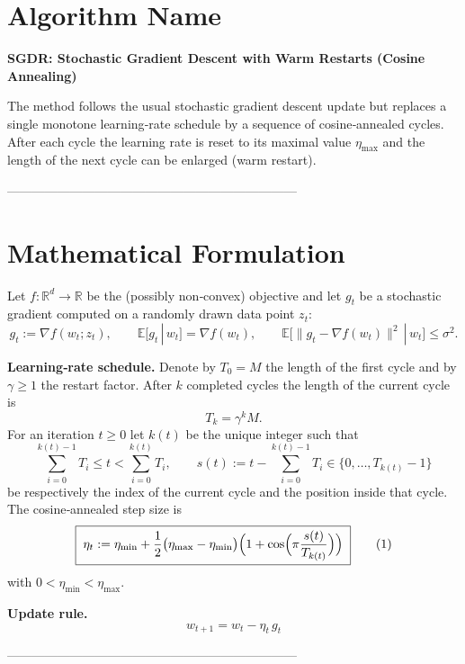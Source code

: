\documentclass{article}
\newcommand{\EE}{\mathbb{E}}
\newcommand{\RR}{\mathbb{R}}
\begin{document}
\section*{Algorithm Name}
\textbf{SGDR: Stochastic Gradient Descent with Warm Restarts (Cosine Annealing)}  

The method follows the usual stochastic gradient descent update but replaces a
single monotone learning‑rate schedule by a sequence of cosine‑annealed cycles.
After each cycle the learning rate is reset to its maximal value $\eta_{\max }$
and the length of the next cycle can be enlarged (warm restart).

---------------------------------------------------------------------

\section*{Mathematical Formulation}
Let $f:\RR^{d}\rightarrow\RR$ be the (possibly non‑convex) objective and let
$g_t$ be a stochastic gradient computed on a randomly drawn data point
$z_t$:
\[
g_t:=\nabla f(w_t;z_t),\qquad 
\EE[g_t\,|\,w_t]=\nabla f(w_t),\qquad 
\EE\big[\|g_t-\nabla f(w_t)\|^{2}\,|\,w_t\big]\le\sigma^{2}.
\]

\medskip
\noindent\textbf{Learning‑rate schedule.}
Denote by $T_{0}=M$ the length of the first cycle and by $\gamma\ge 1$ the
restart factor. After $k$ completed cycles the length of the current cycle is
\[
T_{k}= \gamma^{k}M .
\]
For an iteration $t\ge0$ let $k(t)$ be the unique integer such that
\[
\sum_{i=0}^{k(t)-1}T_{i}\le t < \sum_{i=0}^{k(t)}T_{i},
\qquad
s(t):=t-\sum_{i=0}^{k(t)-1}T_{i}\in\{0,\dots ,T_{k(t)}-1\}
\]
be respectively the index of the current cycle and the position inside that
cycle. The cosine‑annealed step size is
\[
\boxed{\;
\eta_t
:=\eta_{\min}
+\frac{1}{2}\bigl(\eta_{\max}-\eta_{\min}\bigr)
\Bigl(1+\cos\Bigl(\pi\frac{s(t)}{T_{k(t)}}\Bigr)\Bigr)
\; }                                             \tag{1}
\]
with $0<\eta_{\min}<\eta_{\max}$.

\medskip
\noindent\textbf{Update rule.}
\[
\boxed{\; w_{t+1}=w_{t}-\eta_{t}\,g_{t}\; }            \tag{2}
\]

---------------------------------------------------------------------
\end{document}
